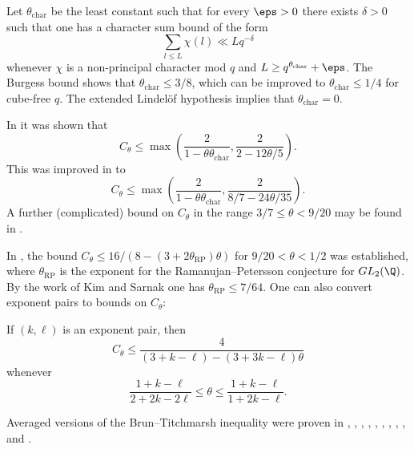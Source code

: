 Let $\theta_{\mathrm{char}}$ be the least constant such that for every $\eps>0$ there exists $\delta>0$ such that one has a character sum bound of the form
$$ \sum_{l \leq L} \chi(l) \ll L q^{-\delta}$$
whenever $\chi$ is a non-principal character mod $q$ and $L \geq q^{\theta_{\mathrm{char}}}+\eps$.  The Burgess bound \cite{burgess, burgess2} shows that $\theta_{\mathrm{char}} \leq 3/8$, which can be improved to $\theta_{\mathrm{char}} \leq 1/4$ for cube-free $q$.  The extended Lindel\"of hypothesis implies that $\theta_{\mathrm{char}}=0$.

In \cite[Theorem 3]{iwaniec_1982} it was shown that
$$ C_\theta \leq \max( \frac{2}{1 - \theta \theta_{\mathrm{char}}}, \frac{2}{2-12\theta/5}).$$
This was improved in \cite{lou-yao-1986} to
$$ C_\theta \leq \max( \frac{2}{1 - \theta \theta_{\mathrm{char}}}, \frac{2}{8/7-24\theta/35}).$$
A further (complicated) bound on $C_\theta$ in the range $3/7 \leq \theta < 9/20$ may be found in \cite[Theorem 2]{baker}.

In \cite{xi-zheng}, the bound $C_\theta \leq 16/(8-(3+2\theta_{\mathrm{RP}})\theta)$ for $9/20 < \theta < 1/2$ was established, where $\theta_{\mathrm{RP}}$ is the exponent for the Ramanujan--Petersson conjecture for $GL_2(\Q)$.  By the work of Kim and Sarnak \cite{kim2003refined} one has $\theta_{\mathrm{RP}} \leq 7/64$.  One can also convert exponent pairs to bounds on $C_\theta$:

\begin{theorem}\label{convert}\cite[Theorem 1.4]{xi-zheng} If $(k,\ell)$ is an exponent pair, then
    $$ C_\theta \leq \frac{4}{(3+k-\ell) - (3+3k-\ell)\theta}$$
whenever
$$ \frac{1+k-\ell}{2+2k-2\ell} \leq \theta \leq \frac{1+k-\ell}{1+2k-\ell}.$$
\end{theorem}

Averaged versions of the Brun--Titchmarsh inequality were proven in \cite{HooleyBT1}, \cite{Hooleypa}, \cite{iwaniec_1982}, \cite{deshouillers-iwaniec-BT}, \cite{Fouvry1984}, \cite{Fouvry1985} \cite{mikawa_1991}, \cite{baker-harman-1996}, \cite{baker-harman-677}, \cite{FouvryRadziwill2022}, \cite{li_average_2025} and \cite{li_PrimesInAP_2026}.

